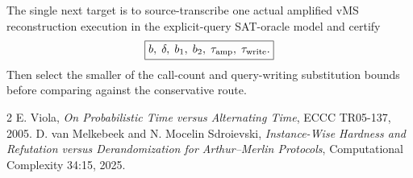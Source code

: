 \documentclass[11pt]{article}
\begin{document}
The single next target is to source-transcribe one actual amplified vMS reconstruction execution in the explicit-query SAT-oracle model and certify
\[
\boxed{b,\;\delta,\;b_1,\;b_2,\;\tau_{\rm amp},\;\tau_{\rm write}.}
\]
Then select the smaller of the call-count and query-writing substitution bounds before comparing against the conservative route.

\begin{thebibliography}{2}
 E. Viola, \emph{On Probabilistic Time versus Alternating Time}, ECCC TR05-137, 2005.
 D. van Melkebeek and N. Mocelin Sdroievski, \emph{Instance-Wise Hardness and Refutation versus Derandomization for Arthur--Merlin Protocols}, Computational Complexity 34:15, 2025.
\end{thebibliography}
\end{document}
